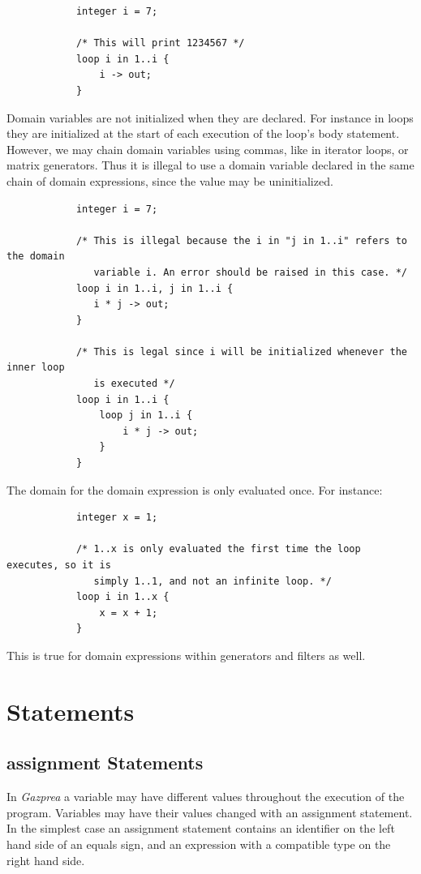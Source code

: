 \documentclass{article}
\begin{document}
		\begin{lstlisting}
			integer i = 7;

			/* This will print 1234567 */
			loop i in 1..i {
				i -> out;
			}
		\end{lstlisting}

		Domain variables are not initialized when they are declared. For instance in loops they are initialized at the
		start of each execution of the loop's body statement. However, we may chain domain variables using commas, like
		in iterator loops, or matrix generators. Thus it is illegal to use a domain variable declared in the same chain
		of domain expressions, since the value may be uninitialized.

		\begin{lstlisting}
			integer i = 7;

			/* This is illegal because the i in "j in 1..i" refers to the domain
			   variable i. An error should be raised in this case. */
			loop i in 1..i, j in 1..i {
			   i * j -> out;
			}

			/* This is legal since i will be initialized whenever the inner loop
			   is executed */
			loop i in 1..i {
				loop j in 1..i {
					i * j -> out;
				}
			}
		\end{lstlisting}

		The domain for the domain expression is only evaluated once. For instance:

		\begin{lstlisting}
			integer x = 1;

			/* 1..x is only evaluated the first time the loop executes, so it is
			   simply 1..1, and not an infinite loop. */
			loop i in 1..x {
				x = x + 1;
			}
		\end{lstlisting}

		This is true for domain expressions within generators and filters as well.


\section{Statements}\label{sec:statements}

	\subsection{assignment Statements}\label{sec:assignment}

		In \textit{Gazprea} a variable may have different values throughout the execution of the program. Variables may
		have their values changed with an assignment statement. In the simplest case an assignment statement contains an
		identifier on the left hand side of an equals sign, and an expression with a compatible type on the right hand
		side.
\end{document}
